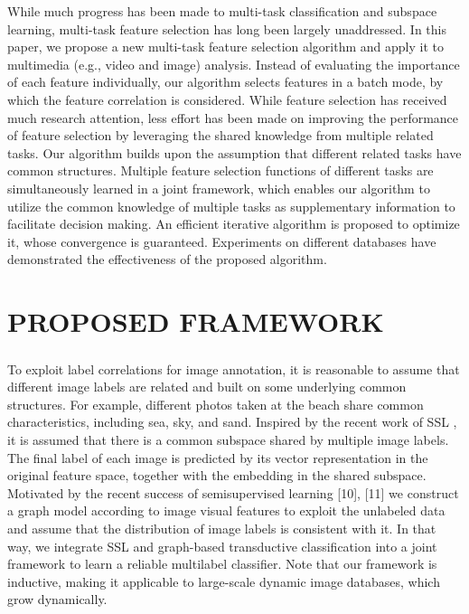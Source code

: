 \documentclass[a4paper,11pt]{report}
\begin{document}
While much progress has been made to multi-task classification and subspace learning, multi-task feature selection has long been largely unaddressed. In this paper, we propose a new multi-task feature selection algorithm and apply it to multimedia (e.g., video and image) analysis. Instead of evaluating the importance of each feature individually, our algorithm selects features in a batch mode, by which the feature correlation is considered. While feature selection has received much research attention, less effort has been made on improving the performance of feature selection by leveraging the shared knowledge from multiple related tasks. Our algorithm builds upon the assumption that different related tasks have common structures. Multiple feature selection functions of different tasks are simultaneously learned in a joint framework, which enables our algorithm to utilize the common knowledge of multiple tasks as supplementary information to facilitate decision making. An efficient iterative algorithm is proposed to optimize it, whose convergence is guaranteed. Experiments on different databases have demonstrated the effectiveness of the proposed algorithm.






\chapter{PROPOSED FRAMEWORK
}
\paragraph{}To exploit label correlations for image annotation, it is reasonable
to assume that different image labels are related and
built on some underlying common structures. For example, different
photos taken at the beach share common characteristics,
including sea, sky, and sand. Inspired by the recent work of
SSL , it is assumed that there is a common subspace
shared by multiple image labels. The final label of each image
is predicted by its vector representation in the original feature
space, together with the embedding in the shared subspace. Motivated
by the recent success of semisupervised learning 
[10], [11] we construct a graph model according to image
visual features to exploit the unlabeled data and assume that the
distribution of image labels is consistent with it. In that way,
we integrate SSL and graph-based transductive classification
into a joint framework to learn a reliable multilabel classifier.
Note that our framework is inductive, making it applicable to
large-scale dynamic image databases, which grow dynamically.
\end{document}
